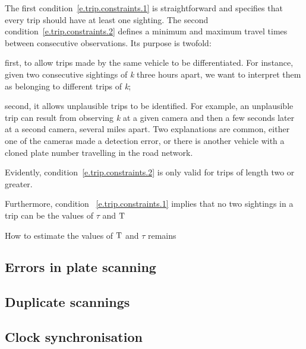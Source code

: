 The first condition~\ref{e.trip.constraints.1} is straightforward and specifies that every trip should have at least one sighting. The second condition~\ref{e.trip.constraints.2} defines a minimum and maximum travel times between consecutive observations. Its purpose is twofold:
\begin{enumerate*}[label=(\roman*)]
  \item first, to allow trips made by the same vehicle to be differentiated. For instance, given two consecutive sightings of \emph{k} three hours apart, we want to interpret them as belonging to different trips of \emph{k};
  \item second, it allows unplausible trips to be identified. For example, an unplausible trip can result from observing \emph{k} at a given camera and then a few seconds later at a second camera, several miles apart. Two explanations are common, either one of the cameras made a detection error, or there is another vehicle with a cloned plate number travelling in the road network.
\end{enumerate*} Evidently, condition~\ref{e.trip.constraints.2} is only valid for trips of length two or greater.


Furthermore, condition ~\ref{e.trip.constraints.1} implies that no two sightings in a trip can be the values of $\tau$ and $\mathrm{T}$

How to estimate the values of $\mathrm{T}$ and $\tau$ remains

\subsection{Errors in plate scanning}


\subsection{Duplicate scannings}

\subsection{Clock synchronisation}
